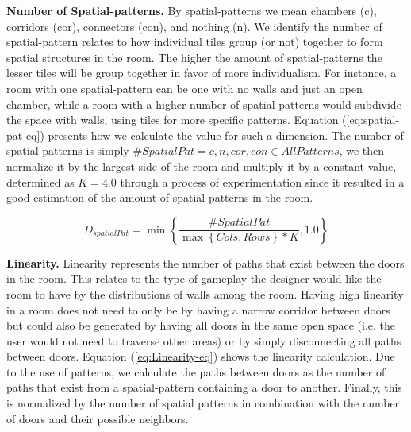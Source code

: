 \textbf{Number of Spatial-patterns.} By spatial-patterns we mean chambers (c), corridors (cor), connectors (con), and nothing (n). We identify the number of spatial-pattern relates to how individual tiles group (or not) together to form spatial structures in the room. The higher the amount of spatial-patterns the lesser tiles will be group together in favor of more individualism. For instance, a room with one spatial-pattern can be one with no walls and just an open chamber, while a room with a higher number of spatial-patterns would subdivide the space with walls, using tiles for more specific patterns. Equation (\ref{eq:spatial-pat-eq}) presents how we calculate the value for such a dimension. The number of spatial patterns is simply $\#SpatialPat=c, n, cor, con \in AllPatterns$, we then normalize it by the largest side of the room and multiply it by a constant value, determined as $K=4.0$ through a process of experimentation since it resulted in a good estimation of the amount of spatial patterns in the room.




\begin{equation} 
\label{eq:spatial-pat-eq}
D_{spatialPat} = \min\left\{\frac{\#SpatialPat}{\max\left\{{Cols, Rows}\right\} * \textit{K}}, 1.0\right\}
\end{equation}

\textbf{Linearity.} Linearity represents the number of paths that exist between the doors in the room. This relates to the type of gameplay the designer would like the room to have by the distributions of walls among the room. Having high linearity in a room does not need to only be by having a narrow corridor between doors but could also be generated by having all doors in the same open space (i.e. the user would not need to traverse other areas) or by simply disconnecting all paths between doors. Equation (\ref{eq:Linearity-eq}) shows the linearity calculation. Due to the use of patterns, we calculate the paths between doors as the number of paths that exist from a spatial-pattern containing a door to another. Finally, this is normalized by the number of spatial patterns in combination with the number of doors and their possible neighbors.

